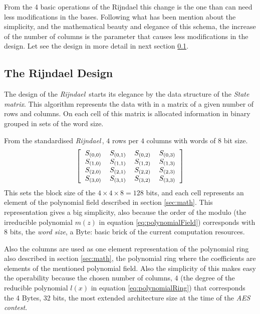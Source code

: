\documentclass[10pt,a4paper,twoside]{llncs}
\newcommand{\rijndael}{\emph{Rijndael}}
\begin{document}
From the 4 basic operations of the Rijndael this change is the one than can need less modifications in the bases. Following what has been mention about the simplicity, and the mathematical beauty and elegance of this schema, the increase of the number of columns is the parameter that causes less modifications in the design. Let see the design in more detail in next section \ref{sec:design}.


\subsection{The Rijndael Design}\label{sec:design}

The design of the \rijndael\, starts its elegance by the data structure of the \emph{State matrix}. This algorithm represents the data with in a matrix of a given number of rows and columns. On each cell of this matrix is allocated information in binary grouped in sets of the word size.

From the standardised \rijndael\,, $4$ rows per $4$ columns with words of $8$ bit size.
\begin{equation}\label{eq:stateMatrix}
 \left[
 \begin{tabular}{cccc}
  $S_{(0,0)}$ & $S_{(0,1)}$ & $S_{(0,2)}$ & $S_{(0,3)}$ \\
  $S_{(1,0)}$ & $S_{(1,1)}$ & $S_{(1,2)}$ & $S_{(1,3)}$ \\
  $S_{(2,0)}$ & $S_{(2,1)}$ & $S_{(2,2)}$ & $S_{(2,3)}$ \\
  $S_{(3,0)}$ & $S_{(3,1)}$ & $S_{(3,2)}$ & $S_{(3,3)}$ \\
 \end{tabular}
 \right]
\end{equation}
This sets the block size of the $4\times4\times8=128$ bits, and each cell represents an element of the polynomial field described in section \ref{sec:math}. This representation gives a big simplicity, also because the order of the modulo (the irreducible polynomial $m(z)$ in equation \ref{eq:polynomialField}) corresponds with $8$ bits, the \emph{word size}, a Byte: basic brick of the current computation resources.

Also the columns are used as one element representation of the polynomial ring also described in section \ref{sec:math}, the polynomial ring where the coefficients are elements of the mentioned polynomial field. Also the simplicity of this makes easy the operability because the chosen number of columns, $4$ (the degree of the reducible polynomial $l(x)$ in equation \ref{eq:polynomialRing}) that corresponds the 4 Bytes, 32 bits, the most extended architecture size at the time of the \emph{AES contest}.
\end{document}
